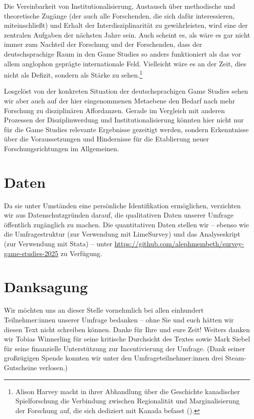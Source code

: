 \documentclass{scrartcl}
\begin{document}
Die Vereinbarkeit von Institutionalisierung, Austausch über methodische und theoretische Zugänge (der auch alle Forschenden, die sich dafür interessieren, miteinschließt) und Erhalt der Interdisziplinarität zu gewährleisten, wird eine der zentralen Aufgaben der nächsten Jahre sein.
Auch scheint es, als wäre es gar nicht immer zum Nachteil der Forschung und der Forschenden, dass der deutschsprachige Raum in den Game Studies so anders funktioniert als das vor allem anglophon geprägte internationale Feld.
Vielleicht wäre es an der Zeit, dies nicht als Defizit, sondern als Stärke zu sehen.\footnote{Alison Harvey macht in ihrer Abhandlung über die Geschichte kanadischer Spielforschung die Verbindung zwischen Regionalität und Marginalisierung der Forschung auf, die sich dediziert mit Kanada befasst (\autocite[vgl.][]{harvey_enquotetheres_2025}).}

Losgelöst von der konkreten Situation der deutschsprachigen Game Studies sehen wir aber auch auf der hier eingenommenen Metaebene den Bedarf nach mehr Forschung zu disziplinären Affordanzen.
Gerade im Vergleich mit anderen Prozessen der Disziplinwerdung und Institutionalisierung könnten hier nicht nur für die Game Studies relevante Ergebnisse gezeitigt werden, sondern Erkenntnisse über die Voraussetzungen und Hindernisse für die Etablierung neuer Forschungsrichtungen im Allgemeinen.


\clearpage
\section*{Daten}
Da sie unter Umständen eine persönliche Identifikation ermöglichen, verzichten wir aus Datenschutzgründen darauf, die qualitativen Daten unserer Umfrage öffentlich zugänglich zu machen.
Die quantitativen Daten stellen wir -- ebenso wie die Umfragestruktur (zur Verwendung mit LimeSurvey) und das Analyseskript (zur Verwendung mit Stata) -- unter \url{https://github.com/alephmembeth/survey-game-studies-2025} zu Verfügung.


\section*{Danksagung}
Wir möchten uns an dieser Stelle vornehmlich bei allen einhundert Teilnehmer:innen unserer Umfrage bedanken -- ohne Sie und euch hätten wir diesen Text nicht schreiben können.
Danke für Ihre und eure Zeit!
Weiters danken wir Tobias Winnerling für seine kritische Durchsicht des Textes sowie Mark Siebel  für seine finanzielle Unterstützung zur Incentivierung der Umfrage.
(Dank seiner großzügigen Spende konnten wir unter den Umfrageteilnehmer:innen drei Steam-Gutscheine verlosen.)
\end{document}
